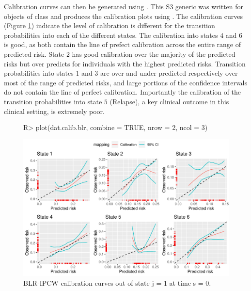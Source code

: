 \documentclass[article,shortnames]{jss}
\begin{document}
Calibration curves can then be generated using . This S3 generic was written for objects of class  and produces the calibration plots using . The calibration curves (Figure \ref{fig:blrj1s0}) indicate the level of calibration is different for the transition probabilities into each of the different states. The calibration into states $4$ and $6$ is good, as both contain the line of prefect calibration across the entire range of predicted risk. State $2$ has good calibration over the majority of the predicted risks but over predicts for individuals with the highest predicted risks. Transition probabilities into states $1$ and $3$ are over and under predicted respectively over most of the range of predicted risks, and large portions of the confidence intervals do not contain the line of perfect calibration. Importantly the calibration of the transition probabilities into state $5$ (Relapse), a key clinical outcome in this clinical setting, is extremely poor.

\begin{figure}[t!]
\centering
\begin{Schunk}
\begin{Sinput}
R> plot(dat.calib.blr, combine = TRUE, nrow = 2, ncol = 3)
\end{Sinput}
\end{Schunk}
\includegraphics{calibmsm-jss-20230613-006}
\caption{\label{fig:blrj1s0} BLR-IPCW calibration curves out of state j =  1 at time s = 0.}
\end{figure}
\end{document}
